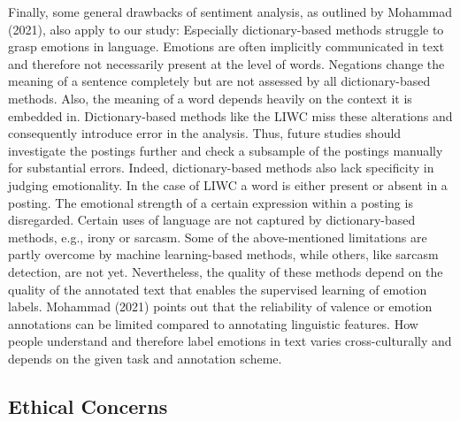 \documentclass[
  english,
  jou,floatsintext]{apa7}
\begin{document}
Finally, some general drawbacks of sentiment analysis, as outlined by Mohammad (2021), also apply to our study: Especially dictionary-based methods struggle to grasp emotions in language. Emotions are often implicitly communicated in text and therefore not necessarily present at the level of words. Negations change the meaning of a sentence completely but are not assessed by all dictionary-based methods. Also, the meaning of a word depends heavily on the context it is embedded in. Dictionary-based methods like the LIWC miss these alterations and consequently introduce error in the analysis. Thus, future studies should investigate the postings further and check a subsample of the postings manually for substantial errors. Indeed, dictionary-based methods also lack specificity in judging emotionality. In the case of LIWC a word is either present or absent in a posting. The emotional strength of a certain expression within a posting is disregarded. Certain uses of language are not captured by dictionary-based methods, e.g., irony or sarcasm. Some of the above-mentioned limitations are partly overcome by machine learning-based methods, while others, like sarcasm detection, are not yet. Nevertheless, the quality of these methods depend on the quality of the annotated text that enables the supervised learning of emotion labels. Mohammad (2021) points out that the reliability of valence or emotion annotations can be limited compared to annotating linguistic features. How people understand and therefore label emotions in text varies cross-culturally and depends on the given task and annotation scheme.

\hypertarget{ethical-concerns}{%
\subsection{Ethical Concerns}\label{ethical-concerns}}
\end{document}
